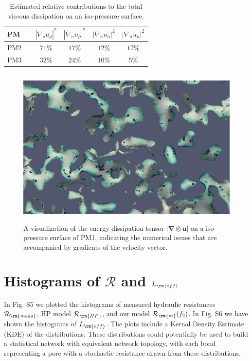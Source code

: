 \documentclass[draft,jgrga]{agutexSI2019}
\begin{document}
\begin{table}[htbp!]\label{tab:sm1}
\centering
\begin{tabular}{l|c|c|c|c|c}
PM & & $\left|\nabla_s u_p\right|^2$ & $ \left|\nabla_n u_p\right|^2$ & $\left|\nabla_n u_n\right|^2$ & $\left|\nabla_n u_n\right|^2$ \\
\hline
PM2 &  & $71 \%$ & $17\%$ & $12\%$ & $12\%$ \\
PM3 &  & $32 \%$ & $24\%$ & $10\%$ & $5\%$ \\
\end{tabular}
\caption{\label{tab:table-name}Estimated relative contributions to the total viscous dissipation on an iso-pressure surface. }
\end{table}




\begin{figure}
\noindent\includegraphics[height=8cm]{figures/nummeric_noise.png}
\caption{A visualization of the energy dissipation tensor $|\mathbf{\nabla}\otimes \mathbf{u}|$ on a iso-pressure surface of PM1, indicating the numerical issues that are accompanied by gradients of the velocity vector.}
\label{fig:numerical noise}
\end{figure}



\section{Histograms of $\mathcal{R}$ and $L_{\rm{eff}}$}

In Fig. S5 we plotted the histograms of measured hydraulic resistances $\mathcal{R}_{\rm{meas}}$, HP model $\mathcal{R}_{\rm{HP}}$, and our model $\mathcal{R}_{\rm{m}}(f_2)$. In Fig. S6 we have shown the histograms of $L_{\rm{eff}}$. The plots include a Kernal Density Estimate (KDE) of the distributions. These distributions could potentially be used to build a statistical network with equivalent network topology, with each bond representing a pore with a stochastic resistance drawn from these distributions. 
\end{document}
